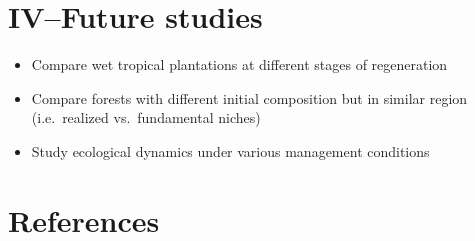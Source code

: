 \documentclass[
]{article}
\begin{document}
\hypertarget{ivfuture-studies}{%
\section{IV--Future studies}\label{ivfuture-studies}}

\begin{itemize}
\item
  Compare wet tropical plantations at different stages of regeneration
\item
  Compare forests with different initial composition but in similar
  region (i.e.~realized vs.~fundamental niches)
\item
  Study ecological dynamics under various management conditions
\end{itemize}

\hypertarget{references}{%
\section{References}\label{references}}
\end{document}
